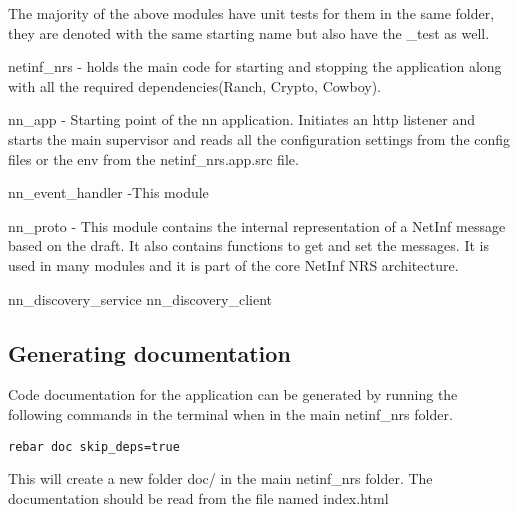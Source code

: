 The majority of the above modules have unit tests for them in the same folder, they are denoted with the same starting name but also have the \_test as well. 

netinf\_nrs - holds the main code for starting and stopping the application along with all the required dependencies(Ranch, Crypto, Cowboy).

nn\_app - Starting point of the nn application. Initiates an http listener and starts the main supervisor and reads all the configuration settings from the config files or the env from the netinf\_nrs.app.src file.

nn\_event\_handler -This module

nn\_proto - This module contains the internal representation of a NetInf message based on the draft. It also contains functions to get and set the messages. It is used in many modules and it is part of the core NetInf NRS architecture.

nn\_discovery\_service
nn\_discovery\_client


\subsection{Generating documentation}

Code documentation for the application can be generated by running the following commands in the terminal when in the main netinf\_nrs folder.

\begin{verbatim}
rebar doc skip_deps=true
\end{verbatim}

This will create a new folder doc/ in the main netinf\_nrs folder. The documentation should be read from the file named index.html



